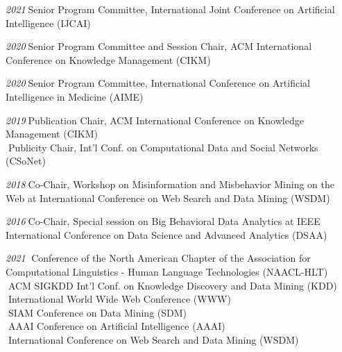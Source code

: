 \documentclass[10pt]{article}
\newenvironment{myindentpar}[1]%
{\begin{list}{}%
         {\setlength{\leftmargin}{#1}}%
         \item[]%
}
{\end{list}}
\newcounter{list}
\begin{document}
\begin{myindentpar}{0.75cm}

\hspace{-0.75cm}{\bf Organizing Committee}

{\small

\hspace{-0.75cm}\textit{2021}\textcolor{white}{.}Senior Program Committee, International Joint Conference on Artificial Intelligence (IJCAI)

\hspace{-0.75cm}\textit{2020}\textcolor{white}{.}Senior Program Committee and Session Chair, ACM International Conference on Knowledge Management (CIKM)

\hspace{-0.75cm}\textit{2020}\textcolor{white}{.}Senior Program Committee, International Conference on Artificial Intelligence in Medicine (AIME)

\hspace{-0.75cm}\textit{2019}\textcolor{white}{.}Publication Chair, ACM International Conference on Knowledge Management (CIKM) \\
\textcolor{white}{.}Publicity Chair, Int'l Conf. on Computational Data and Social Networks (CSoNet)

\hspace{-0.75cm}\textit{2018}\textcolor{white}{.}Co-Chair, Workshop on Misinformation and Misbehavior Mining on the Web at International Conference on Web Search and Data Mining (WSDM)

\hspace{-0.75cm}\textit{2016}\textcolor{white}{.}Co-Chair, Special session on Big Behavioral Data Analytics at IEEE International Conference on Data Science and Advanced Analytics (DSAA)

}


\hspace{-0.75cm}{\bf Program Committee}

{\small

\hspace{-0.75cm}\textit{2021}
\textcolor{white}{.}Conference of the North American Chapter of the Association for Computational Linguistics - Human Language Technologies (NAACL-HLT) \\
\textcolor{white}{.}ACM SIGKDD Int'l Conf. on Knowledge Discovery and Data Mining (KDD) \\
\textcolor{white}{.}International World Wide Web Conference (WWW) \\
\textcolor{white}{.}SIAM Conference on Data Mining (SDM) \\
\textcolor{white}{.}AAAI Conference on Artificial Intelligence (AAAI) \\
\textcolor{white}{.}International Conference on Web Search and Data Mining (WSDM)

}
\end{myindentpar}
\end{document}
